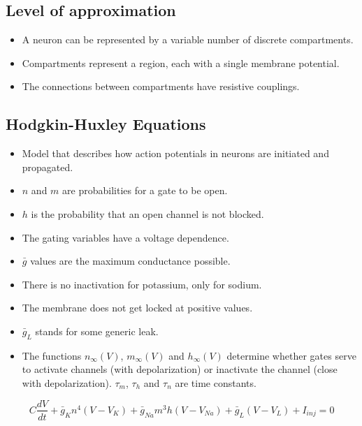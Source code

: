 \documentclass[a4paper, 12pt]{article}
\begin{document}
\subsection{Level of approximation}
\begin{itemize}[noitemsep,nolistsep]
	\item A neuron can be represented by a variable number of discrete compartments.
	\item Compartments represent a region, each with a single membrane potential.
	\item The connections between compartments have resistive couplings.
\end{itemize}

\subsection{Hodgkin-Huxley Equations}
\begin{itemize}[noitemsep,nolistsep]
	\item Model that describes how action potentials in neurons are initiated and propagated.
	\item $n$ and $m$ are probabilities for a gate to be open.
	\item $h$ is the probability that an open channel is not blocked.
	\item The gating variables have a voltage dependence.
	\item $\bar{g}$ values are the maximum conductance possible.
	\item There is no inactivation for potassium, only for sodium.
	\item The membrane does not get locked at positive values.
	\item $\bar{g}_L$ stands for some generic leak.
	\item The functions $n_\infty(V)$, $m_\infty(V)$ and $h_\infty(V)$ determine whether gates serve to activate channels (with depolarization) or inactivate the channel (close with depolarization). $\tau_m$, $\tau_h$ and $\tau_n$ are time constants.
\end{itemize}
\[C\frac{dV}{dt}+\bar{g}_Kn^4(V-V_K)+\bar{g}_{Na}m^3h(V-V_{Na})+\bar{g}_L(V-V_L)+I_{inj}=0\]
\end{document}
